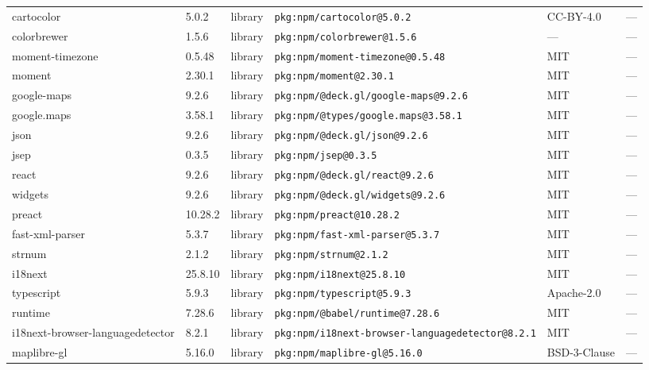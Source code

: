 \documentclass[11pt,a4paper]{article}
\begin{document}
\begin{longtable}{|p{4cm}|p{2cm}|p{1.6cm}|p{5cm}|p{1.5cm}|p{3.5cm}|}
\raggedright cartocolor & 5.0.2 & library & \small\texttt{pkg:npm/cartocolor@5.0.2} & CC-BY-4.0 & \small — \\
\raggedright colorbrewer & 1.5.6 & library & \small\texttt{pkg:npm/colorbrewer@1.5.6} & — & \small — \\
\raggedright moment-timezone & 0.5.48 & library & \small\texttt{pkg:npm/moment-timezone@0.5.48} & MIT & \small — \\
\raggedright moment & 2.30.1 & library & \small\texttt{pkg:npm/moment@2.30.1} & MIT & \small — \\
\raggedright google-maps & 9.2.6 & library & \small\texttt{pkg:npm/@deck.gl/google-maps@9.2.6} & MIT & \small — \\
\raggedright google.maps & 3.58.1 & library & \small\texttt{pkg:npm/@types/google.maps@3.58.1} & MIT & \small — \\
\raggedright json & 9.2.6 & library & \small\texttt{pkg:npm/@deck.gl/json@9.2.6} & MIT & \small — \\
\raggedright jsep & 0.3.5 & library & \small\texttt{pkg:npm/jsep@0.3.5} & MIT & \small — \\
\raggedright react & 9.2.6 & library & \small\texttt{pkg:npm/@deck.gl/react@9.2.6} & MIT & \small — \\
\raggedright widgets & 9.2.6 & library & \small\texttt{pkg:npm/@deck.gl/widgets@9.2.6} & MIT & \small — \\
\raggedright preact & 10.28.2 & library & \small\texttt{pkg:npm/preact@10.28.2} & MIT & \small — \\
\raggedright fast-xml-parser & 5.3.7 & library & \small\texttt{pkg:npm/fast-xml-parser@5.3.7} & MIT & \small — \\
\raggedright strnum & 2.1.2 & library & \small\texttt{pkg:npm/strnum@2.1.2} & MIT & \small — \\
\raggedright i18next & 25.8.10 & library & \small\texttt{pkg:npm/i18next@25.8.10} & MIT & \small — \\
\raggedright typescript & 5.9.3 & library & \small\texttt{pkg:npm/typescript@5.9.3} & Apache-2.0 & \small — \\
\raggedright runtime & 7.28.6 & library & \small\texttt{pkg:npm/@babel/runtime@7.28.6} & MIT & \small — \\
\raggedright i18next-browser-languagedetector & 8.2.1 & library & \small\texttt{pkg:npm/i18next-browser-languagedetector@8.2.1} & MIT & \small — \\
\raggedright maplibre-gl & 5.16.0 & library & \small\texttt{pkg:npm/maplibre-gl@5.16.0} & BSD-3-Clause & \small — \\

\end{longtable}
\end{document}
